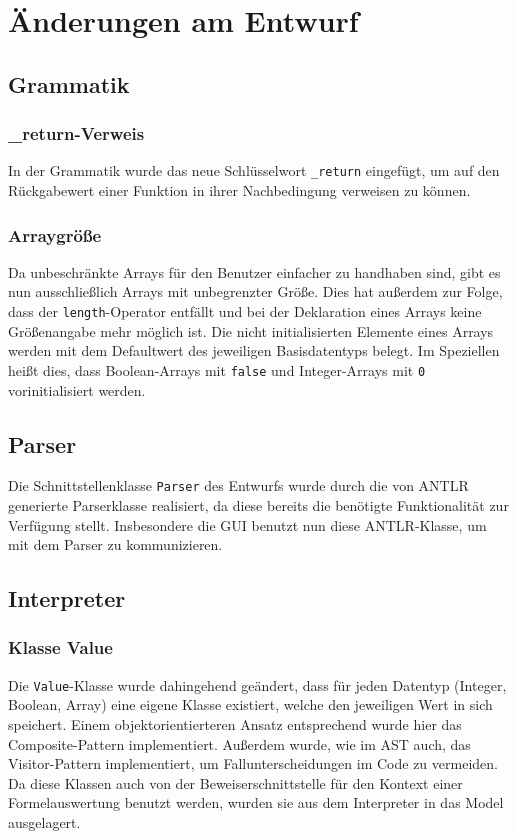 \section{Änderungen am Entwurf}
\subsection{Grammatik}
\subsubsection{\_return-Verweis}
In der Grammatik wurde das neue Schlüsselwort \texttt{\_return} eingefügt, um auf den Rückgabewert einer Funktion in ihrer Nachbedingung verweisen zu können.
\subsubsection{Arraygröße}
Da unbeschränkte Arrays für den Benutzer einfacher zu handhaben sind, gibt es nun ausschließlich Arrays mit unbegrenzter Größe. Dies hat außerdem zur Folge, dass der \texttt{length}-Operator entfällt und bei der Deklaration eines Arrays keine Größenangabe mehr möglich ist. Die nicht initialisierten Elemente eines Arrays werden mit dem Defaultwert des jeweiligen Basisdatentyps belegt. Im Speziellen heißt dies, dass Boolean-Arrays mit \texttt{false} und Integer-Arrays mit \texttt{0} vorinitialisiert werden.

\subsection{Parser\label{aenderung_parser}}
Die Schnittstellenklasse \texttt{Parser} des Entwurfs wurde durch die von ANTLR generierte Parserklasse realisiert, da diese bereits die benötigte Funktionalität zur Verfügung stellt. Insbesondere die GUI benutzt nun diese ANTLR-Klasse, um mit dem Parser zu kommunizieren.

\subsection{Interpreter}
\subsubsection{Klasse Value}
Die \texttt{Value}-Klasse wurde dahingehend geändert, dass für jeden Datentyp (Integer, Boolean, Array) eine eigene Klasse existiert, welche den jeweiligen Wert in sich speichert. Einem objektorientierteren Ansatz entsprechend wurde hier das Composite-Pattern implementiert. Außerdem wurde, wie im AST auch, das Visitor-Pattern implementiert, um Fallunterscheidungen im Code zu vermeiden. Da diese Klassen auch von der Beweiserschnittstelle für den Kontext einer Formelauswertung benutzt werden, wurden sie aus dem Interpreter in das Model ausgelagert.

